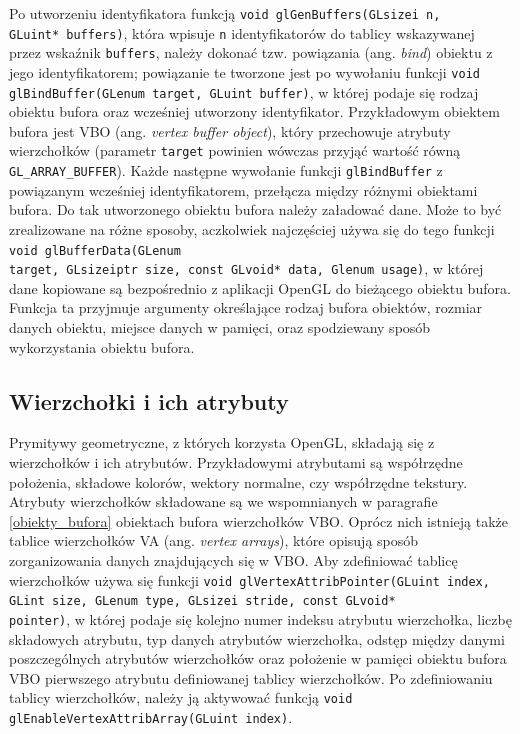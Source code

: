 \documentclass[12pt, twoside, openany]{report}
\begin{document}
Po utworzeniu identyfikatora funkcją \texttt{void glGenBuffers(GLsizei n,\\GLuint* buffers)}, która wpisuje \texttt n identyfikatorów do tablicy wskazywanej\\przez wskaźnik \texttt{buffers}, należy dokonać tzw. powiązania (ang. \textit{bind}) obiektu z jego identyfikatorem; powiązanie te tworzone jest po wywołaniu funkcji \texttt{void\\ glBindBuffer(GLenum target, GLuint buffer)}, w której podaje się rodzaj obiektu bufora oraz wcześniej utworzony identyfikator. Przykładowym obiektem bufora jest VBO (ang. \textit{vertex buffer object}), który przechowuje atrybuty wierzchołków (parametr \texttt{target} powinien wówczas przyjąć wartość równą \texttt{GL\_ARRAY\_BUFFER}).
Każde następne wywołanie funkcji \texttt{glBindBuffer} z powiązanym wcześniej identyfikatorem, przełącza między różnymi obiektami bufora.
Do tak utworzonego obiektu bufora należy załadować dane. Może to być zrealizowane na różne sposoby, aczkolwiek najczęściej używa się do tego funkcji  \texttt{void glBufferData(GLenum\\target, GLsizeiptr size, const GLvoid* data, Glenum usage)}, w której dane kopiowane są bezpośrednio z aplikacji OpenGL do bieżącego obiektu bufora. Funkcja ta przyjmuje argumenty określające rodzaj bufora obiektów, rozmiar danych obiektu, miejsce danych w pamięci, oraz spodziewany sposób wykorzystania obiektu bufora.

\subsection{Wierzchołki i ich atrybuty}
\label{wierzcholki_i_ich_atrybuty}

Prymitywy geometryczne, z których korzysta OpenGL, składają się z wierzchołków i ich atrybutów. Przykładowymi atrybutami są współrzędne położenia, składowe kolorów, wektory normalne, czy współrzędne tekstury. Atrybuty wierzchołków składowane są we wspomnianych w paragrafie \ref{obiekty_bufora} obiektach bufora wierzchołków VBO. Oprócz nich istnieją także tablice wierzchołków VA (ang. \textit{vertex arrays}), które opisują sposób zorganizowania danych znajdujących się w VBO. Aby zdefiniować tablicę wierzchołków używa się funkcji \texttt{void glVertexAttribPointer(GLuint index, GLint size, GLenum type, GLsizei stride, const GLvoid*\\pointer)}, w której podaje się kolejno numer indeksu atrybutu wierzchołka, liczbę składowych atrybutu, typ danych atrybutów wierzchołka, odstęp między danymi poszczególnych atrybutów wierzchołków oraz położenie w pamięci obiektu bufora VBO pierwszego atrybutu definiowanej tablicy wierzchołków.
Po zdefiniowaniu tablicy wierzchołków, należy ją aktywować funkcją \texttt{void\\glEnableVertexAttribArray(GLuint index)}.
\end{document}

